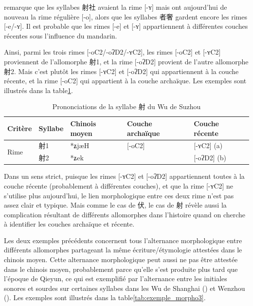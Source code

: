 \documentclass{scrbook}
\newcounter{c}[subsubsection]
\newcommand{\difwenbai}{couches archaïque et récente\xspace}
\newcommand{\illustre}{Les exemples sont illustrés dans la table\xspace}
\begin{document}
\begin{sloppypar}
\textcite[14]{Shi2019she_suzhou} remarque que les syllabes 射社 avaient la rime [-ʏ] mais ont aujourd'hui de nouveau la rime régulière [-o], alors que les syllabes 者奢 gardent encore les rimes [-e/-ʏ]. Il est probable que les rimes [-e] et [-ʏ] appartiennent à différentes couches récentes sous l'influence du mandarin. 

Ainsi, parmi les trois rimes [-oC2/-oʔD2/-ʏC2], les rimes [-oC2] et [-ʏC2] proviennent de l'allomorphe 射1, et la rime [-oʔD2] provient de l'autre allomorphe 射2. Mais c'est plutôt les rimes [-ʏC2] et [-oʔD2] qui appartiennent à la couche récente, et la rime [-oC2] qui appartient à la couche archaïque.  \illustre \ref{tab:exemple_morpho2}.

\begin{table}[htbp]
  \centering
    \begin{tabular}{lllrl}
    \toprule
    Critère & Syllabe & Chinois moyen  & \multicolumn{1}{l}{Couche archaïque} & Couche récente \\
    \midrule
    \multirow{2}[2]{*}{Rime} & 射1    & *ʑjæH & \multicolumn{1}{l}{[-oC2]} & [-ʏC2] (a) \\
          & 射2    & *ʑek  &       & [-oʔD2] (b) \\
    \bottomrule
    \end{tabular}%
  \caption{Prononciations de la syllabe 射 du Wu de Suzhou}
  \label{tab:exemple_morpho2}%
\end{table}%

Dans un sens strict, puisque les rimes [-ʏC2] et [-oʔD2] appartiennent toutes à la couche récente (probablement à différentes couches), et que la rime [-ʏC2] ne s'utilise plus aujourd'hui, le lien morphologique entre ces deux rime n'est pas assez clair et typique. Mais comme le cas de 伏, le cas de 射 révèle aussi la complication résultant de différents allomorphes dans l'histoire quand on cherche à identifier les \difwenbai.

Les deux exemples précédents concernent tous l'alternance morphologique entre différents allomorphes partageant la même écriture/étymologie attestées dans le chinois moyen. Cette alternance morphologique peut aussi ne pas être attestée dans le chinois moyen, probablement parce qu'elle s'est produite plus tard que l'époque de Qieyun, ce qui est exemplifié par l'alternance entre les initiales sonores et sourdes sur certaines syllabes dans les Wu de Shanghai (\cite[132--133]{Shen1988shanghai}) et Wenzhou (\cite[107]{Zhengzhang2008wenzhou}). \illustre \ref{tab:exemple_morpho3}.


\end{sloppypar}
\end{document}
